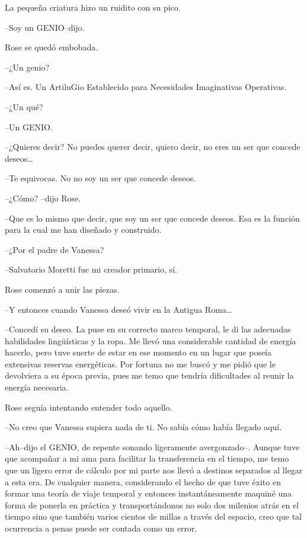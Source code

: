 La pequeña criatura hizo un ruidito con su pico.

--Soy un GENIO--dijo.

Rose se quedó embobada.

--¿Un genio?

--Así es. Un ArtiluGio Establecido para Necesidades Imaginativas
Operativas.

--¿Un qué?

--Un GENIO.

--¿Quieres decir? No puedes querer decir, quiero decir, no eres un ser
que concede deseos\ldots{}

--Te equivocas. No no soy un ser que concede deseos.

--¿Cómo? --dijo Rose.

--Que es lo mismo que decir, que soy un ser que concede deseos. Esa es
la función para la cual me han diseñado y construido.

--¿Por el padre de Vanessa?

--Salvatorio Moretti fue mi creador primario, sí.

Rose comenzó a unir las piezas.

--Y entonces cuando Vanessa deseó vivir en la Antigua Roma\ldots{}

--Concedí su deseo. La puse en su correcto marco temporal, le di las
adecuadas habilidades lingüísticas y la ropa. Me llevó una considerable
cantidad de energía hacerlo, pero tuve suerte de estar en ese momento en
un lugar que poseía extensivas reservas energéticas. Por fortuna no me
buscó y me pidió que le devolviera a su época previa, pues me temo que
tendría dificultades al reunir la energía necesaria.

Rose seguía intentando entender todo aquello.

--No creo que Vanessa supiera nada de ti. No sabía cómo había llegado
aquí.

--Ah--dijo el GENIO, de repente sonando ligeramente avergonzado--.
Aunque tuve que acompañar a mi ama para facilitar la transferencia en el
tiempo, me temo que un ligero error de cálculo por mi parte nos llevó a
destinos separados al llegar a esta era. De cualquier manera,
considerando el hecho de que tuve éxito en formar una teoría de viaje
temporal y entonces instantáneamente maquiné una forma de ponerla en
práctica y transportándonos no solo dos milenios atrás en el tiempo sino
que también varios cientos de millas a través del espacio, creo que tal
ocurrencia a penas puede ser contada como un error.

